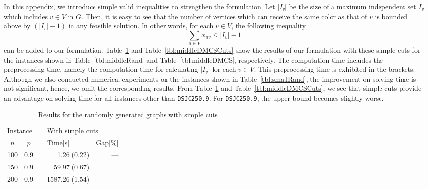 \documentclass[11pt,a4paper]{article}
\begin{document}
In this appendix, we introduce simple valid inequalities to strengthen the formulation. 
Let $|I_v|$ be the size of a maximum independent set $I_v$ which includes $v \in V$ in $G$. 
Then, it is easy to see that the number of vertices which can receive the same color as that of $v$ is 
bounded above by $(|I_v| - 1)$ in any feasible solution. In other words, for each $v \in V$, 
the following inequality 
\begin{equation*}
\sum_{u \in V} x_{uv} \le |I_v| - 1
\end{equation*}
can be added to our formulation. 
Table~\ref{tbl:middleRandCuts} and Table~\ref{tbl:middleDMCSCuts} show 
the results of our formulation with these simple cuts for the instances shown in 
Table~\ref{tbl:middleRand} and Table~\ref{tbl:middleDMCS}, respectively. 
The computation time includes the preprocessing time, 
namely the computation time for calculating $|I_v|$ for each $v \in V$. 
This preprocessing time is exhibited in the brackets. 
Although we also conducted numerical experiments on the instances shown in Table~\ref{tbl:smallRand}, 
the improvement on solving time is not significant, hence, we omit the corresponding results. 
From Table~\ref{tbl:middleRandCuts} and Table~\ref{tbl:middleDMCSCuts}, 
we see that simple cuts provide an advantage on solving time for all instances other than \texttt{DSJC250.9}.  
For \texttt{DSJC250.9}, the upper bound becomes slightly worse. 

\begin{table}[tb]
\caption{Results for the randomly generated graphs with simple cuts \label{tbl:middleRandCuts}}
\begin{center}
{\small
\begin{tabular}{rrrrrrrrrrrrrrrrrrrrrrrr}														
\toprule													
\multicolumn{2}{l}{Instance}			&&	\multicolumn{2}{l}{With simple cuts}	\\	\cline{1-2} \cline{4-5}
\multicolumn{1}{c}{$n$}	&	\multicolumn{1}{c}{$p$}	&&	\multicolumn{1}{l}{Time[s]}	&	\multicolumn{1}{l}{Gap[\%]}	\\
\midrule														
100	&	0.9	&&	1.26	(0.22)		&	---\\	
150	&	0.9	&&	59.97 (0.67)		&	---\\	
200	&	0.9	&&	1587.26 (1.54)		&	---\\
\bottomrule					
\end{tabular}	
}													
\end{center}
\end{table}
\end{document}
